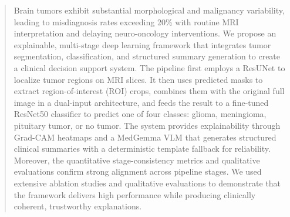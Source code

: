 \begin{abstract}
Brain tumors exhibit substantial morphological and malignancy variability, leading to misdiagnosis rates exceeding 20\% with routine MRI 
interpretation and delaying neuro-oncology interventions. We propose an explainable, multi-stage deep learning framework that integrates
 tumor segmentation, classification, and structured summary generation to create a clinical decision support system. The pipeline first employs 
 a ResUNet to localize tumor regions on MRI slices. It then uses predicted masks to extract region-of-interest (ROI) crops, combines them 
 with the original full image in a dual-input architecture, and feeds the result to a fine-tuned ResNet50 classifier to predict one of four 
 classes: glioma, meningioma, pituitary tumor, or no tumor. The system provides explainability through Grad-CAM heatmaps and a MedGemma VLM that generates structured clinical summaries with a deterministic template fallback for reliability.
  Moreover, the quantitative stage-consistency metrics and qualitative 
  evaluations confirm strong alignment across pipeline stages. We used extensive ablation studies and qualitative evaluations to demonstrate
   that the framework delivers high performance while producing clinically coherent, trustworthy explanations.

\end{abstract}